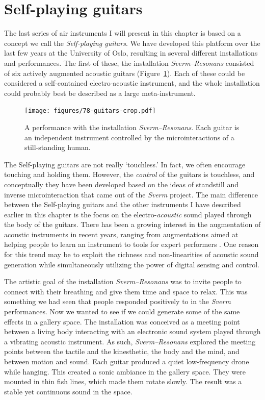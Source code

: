 \section{Self-playing guitars}\label{self-playing-guitars}

The last series of air instruments I will present in this chapter is based on a concept we call the \emph{Self-playing guitars}. We have developed this platform over the last few years at the University of Oslo, resulting in several different installations and performances. The first of these, the installation \emph{Sverm--Resonans} consisted of six actively augmented acoustic guitars (Figure~\ref{fig:sverm-resonans}). Each of these could be considered a self-contained electro-acoustic instrument, and the whole installation could probably best be described as a large meta-instrument.

\begin{figure}[tp]
\texttt{[image: figures/78-guitars-crop.pdf]}
\caption{A performance with the installation \emph{Sverm--Resonans}. Each guitar is an independent instrument controlled by the microinteractions of a still-standing human.}
\label{fig:sverm-resonans}
\end{figure}

The Self-playing guitars are not really `touchless.' In fact, we often encourage touching and holding them. However, the \emph{control} of the guitars is touchless, and conceptually they have been developed based on the ideas of standstill and inverse microinteraction that came out of the \emph{Sverm} project. The main difference between the Self-playing guitars and the other instruments I have described earlier in this chapter is the focus on the electro-\emph{acoustic} sound played through the body of the guitars.
There has been a growing interest in the augmentation of acoustic instruments in recent years, ranging from augmentations aimed at helping people to learn an instrument \citep{heller_augmented_2017,baldwin_tromba_2016} to tools for expert performers \citep{reboursiere_multimodal_2010,kimura_extracting_2012,lahdeoja_augmented_2015}. One reason for this trend may be to exploit the richness and non-linearities of acoustic sound generation while simultaneously utilizing the power of digital sensing and control.

The artistic goal of the installation \emph{Sverm--Resonans} was to invite people to connect with their breathing and give them time and space to relax. This was something we had seen that people responded positively to in the \emph{Sverm} performances. Now we wanted to see if we could generate some of the same effects in a gallery space. The installation was conceived as a meeting point between a living body interacting with an electronic sound system played through a vibrating acoustic instrument. As such, \emph{Sverm--Resonans} explored the meeting points between the tactile and the kinesthetic, the body and the mind, and between motion and sound. Each guitar produced a quiet low-frequency drone while hanging. This created a sonic ambiance in the gallery space. They were mounted in thin fish lines, which made them rotate slowly. The result was a stable yet continuous sound in the space.

